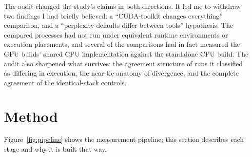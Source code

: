 \documentclass[11pt]{article}
\begin{document}
The audit changed the study's claims in both directions. It led me to
withdraw two findings I had briefly believed: a ``CUDA-toolkit
changes everything'' comparison, and a ``perplexity defaults differ
between tools'' hypothesis. The compared processes had not run under
equivalent runtime environments or execution placements, and several
of the comparisons had in fact measured the GPU builds' shared CPU
implementation against the standalone CPU build. The audit also
sharpened what survives: the agreement structure of runs it classified
as differing in execution, the near-tie anatomy of divergence, and the
complete agreement of the identical-stack controls.

\section{Method}\label{sec:method}

Figure~\ref{fig:pipeline} shows the measurement pipeline; this section
describes each stage and why it is built that way.
\end{document}
